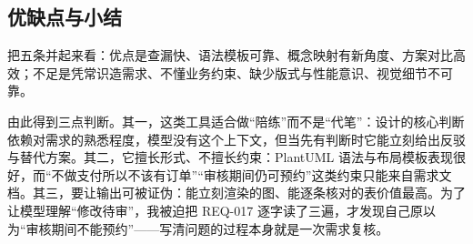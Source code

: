 \subsection{优缺点与小结}

把五条并起来看：优点是查漏快、语法模板可靠、概念映射有新角度、方案对比高效；不足是凭常识造需求、不懂业务约束、缺少版式与性能意识、视觉细节不可靠。

由此得到三点判断。其一，这类工具适合做“陪练”而不是“代笔”：设计的核心判断依赖对需求的熟悉程度，模型没有这个上下文，但当先有判断时它能立刻给出反驳与替代方案。其二，它擅长形式、不擅长约束：PlantUML 语法与布局模板表现很好，而“不做支付所以不该有订单”“审核期间仍可预约”这类约束只能来自需求文档。其三，要让输出可被证伪：能立刻渲染的图、能逐条核对的表价值最高。为了让模型理解“修改待审”，我被迫把 REQ-017 逐字读了三遍，才发现自己原以为“审核期间不能预约”——写清问题的过程本身就是一次需求复核。
